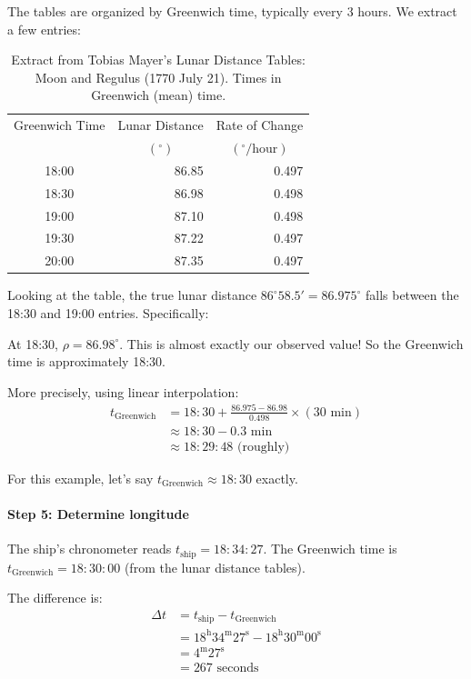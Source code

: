 The tables are organized by Greenwich time, typically every 3 hours. We extract a few entries:

\begin{table}[htbp]
\centering
\caption{Extract from Tobias Mayer's Lunar Distance Tables: Moon and Regulus (1770 July 21). Times in Greenwich (mean) time.}
\label{tab:mayer-example}
\begin{tabular}{crr}
\toprule
\multicolumn{1}{c}{Greenwich Time} & \multicolumn{1}{c}{Lunar Distance} & \multicolumn{1}{c}{Rate of Change} \\
& \multicolumn{1}{c}{$(^{\circ})$} & \multicolumn{1}{c}{$(^{\circ}/\text{hour})$} \\
\midrule
18:00 & 86.85 & 0.497 \\
18:30 & 86.98 & 0.498 \\
19:00 & 87.10 & 0.498 \\
19:30 & 87.22 & 0.497 \\
20:00 & 87.35 & 0.497 \\
\bottomrule
\end{tabular}
\end{table}

Looking at the table, the true lunar distance $86^{\circ} 58.5' = 86.975^{\circ}$ falls between the 18:30 and 19:00 entries. Specifically:

At 18:30, $\rho = 86.98^{\circ}$. This is almost exactly our observed value! So the Greenwich time is approximately 18:30.

More precisely, using linear interpolation:
\begin{align}
t_{\text{Greenwich}} &= 18:30 + \frac{86.975 - 86.98}{0.498} \times (30 \text{ min}) \\
&\approx 18:30 - 0.3 \text{ min} \\
&\approx 18:29:48 \text{ (roughly)}
\end{align}

For this example, let's say $t_{\text{Greenwich}} \approx 18:30$ exactly.

\paragraph{Step 5: Determine longitude}

The ship's chronometer reads $t_{\text{ship}} = 18:34:27$.
The Greenwich time is $t_{\text{Greenwich}} = 18:30:00$ (from the lunar distance tables).

The difference is:
\begin{align}
\Delta t &= t_{\text{ship}} - t_{\text{Greenwich}} \\
&= 18^{\mathrm{h}} 34^{\mathrm{m}} 27^{\mathrm{s}} - 18^{\mathrm{h}} 30^{\mathrm{m}} 00^{\mathrm{s}} \\
&= 4^{\mathrm{m}} 27^{\mathrm{s}} \\
&= 267 \text{ seconds}
\end{align}

